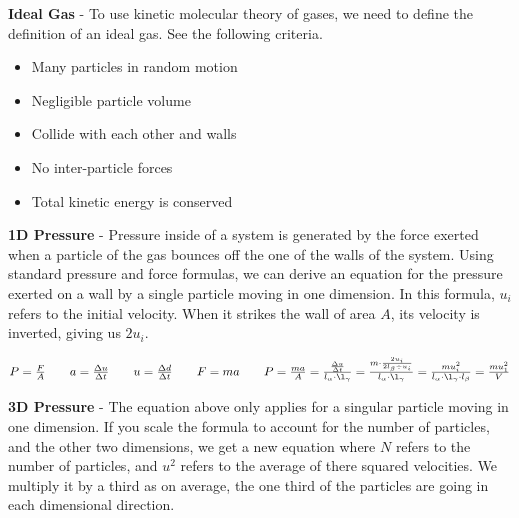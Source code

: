 \documentclass{article}
\begin{document}
\begin{minipage}{4.4cm}
\end{minipage}
\begin{minipage}{11.8cm}
	\textbf{Ideal Gas} - To use kinetic molecular theory of gases, we need to define the definition of an ideal gas. See the following criteria.
	\begin{itemize}
		\item Many particles in random motion
		\item Negligible particle volume
		\item Collide with each other and walls
		\item No inter-particle forces
		\item Total kinetic energy is conserved
	\end{itemize}
\end{minipage}

\vspace{10pt}
\noindent\textbf{1D Pressure} - Pressure inside of a system is generated by the force exerted when a particle of the gas bounces off the one of the walls of the system. Using standard pressure and force formulas, we can derive an equation for the pressure exerted on a wall by a single particle moving in one dimension. In this formula, $u_i$ refers to the initial velocity. When it strikes the wall of area $A$, its velocity is inverted, giving us $2u_i$. \\
\begin{qq}

	\begin{center}
		$P=\frac{F}{A} \quad\quad a=\frac{\Delta u}{\Delta t} \quad\quad u=\frac{\Delta d}{\Delta t} \quad\quad F=ma \quad\quad P=\frac{ma}{A}=\frac{\frac{\Delta u}{\Delta t}}{l_\alpha\cdot\l_\gamma}=\frac{m\cdot\frac{2u_i}{2l_\beta \div u_i} }{l_\alpha\cdot\l_\gamma}=\frac{mu_i^2}{l_\alpha\cdot\l_\gamma\cdot l_\beta}=\frac{mu_1^2}{V} $
	\end{center}

\end{qq}

\pagebreak

\noindent \textbf{3D Pressure} - The equation above only applies for a singular particle moving in one dimension. If you scale the formula to account for the number of particles, and the other two dimensions, we get a new equation where $N$ refers to the number of particles, and $u^2$ refers to the average of there squared velocities. We multiply it by a third as on average, the one third of the particles are going in each dimensional direction.\\
\end{document}
